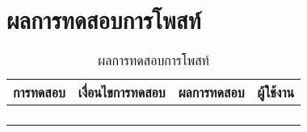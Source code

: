 \section{ผลการทดสอบการโพสท์}
\begin{table}[H]
	\caption{ผลการทดสอบการโพสท์}
    \centering	
	\label{tab:test10}
    \begin{tabular}{ | p{4cm} | p{4cm} | p{4cm} | p{2cm} | }
		\hline
	\multicolumn{1}{|c|}{การทดสอบ} & \multicolumn{1}{c|}{เงื่อนไขการทดสอบ} & \multicolumn{1}{c|}{ผลการทดสอบ} & \multicolumn{1}{c|}{ผู้ใช้งาน}                             \\ \hline
	\setstretch{1.0}{ทดสอบการโพสท์}
	& \setstretch{1.0}{ผู้ใช้กดโพสท์โดยไม่ระบุข้อความ}
	& \setstretch{1.0}{ระบบจะแสดงข้อความ “กรุณาระบุข้อความให้ถูกต้อง” } 
	&\setstretch{1.0}{\begin{flushleft}ผู้ใช้งาน\end{flushleft}} \\ \cline{2-3} 
	& \setstretch{1.0}{ผู้ใช้โพสท์โดยกรอกข้อความ และไม่เพิ่มรูปภาพ} 
	& \setstretch{1.0}{ระบบจะบันทึกข้อมูลเฉพาะข้อความ} 
	&\setstretch{1.0}{}\\ \cline{2-3} 
	& \setstretch{1.0}{ผู้ใช้โพสท์โดยกรอกข้อความ และเพิ่มรูปภาพ} 
	& \setstretch{1.0}{ระบบจะบันทึกข้อมูลข้อความและรูปภาพ} 
	&\setstretch{1.0}{}\\ \cline{2-3} 
	& \setstretch{1.0}{ผู้ใช้โพสท์โดยไม่เลือกประเภท} 
	& \setstretch{1.0}{ระบบจะแสดงข้อความ “กรุณาเลือกประเภท”} 
	&\setstretch{1.0}{}\\ \cline{2-3} 
    \end{tabular}
\end{table}

